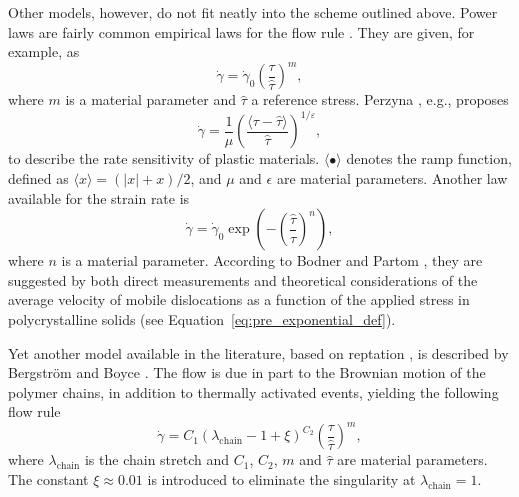 Other models, however, do not fit neatly into the scheme outlined above.
Power laws are fairly common empirical laws for the flow rule \citep{brownPowerlawCreepEquation1980}.
They are given, for example, as \citep{bergstromMechanicsSolidPolymers2015}
\begin{equation}
	\label{eq:flow_rule_power_law}
	\dot \gamma = \dot \gamma_0 \left(\frac{\tau}{\hat \tau}\right)^m,
\end{equation}
where $m$ is a material parameter and $\hat \tau$ a reference stress.
Perzyna \citep{perzynaConstitutiveEquationsRate1963}, e.g., proposes
\begin{equation}
\label{eq:flow_rule_perzyna}
  \dot \gamma = \frac{1}{\mu}\left(\frac{\langle\tau - \hat\tau\rangle}{\hat\tau}\right)^{1/\varepsilon},
\end{equation}
to describe the rate sensitivity of plastic materials.
$\langle\bullet\rangle$ denotes the ramp function, defined as $\langle x\rangle = (|x| + x) /2$, and $\mu$ and $\epsilon$ are material parameters.
Another law available for the strain rate is \citep{kellyInfluenceLimitingDislocation1974, bodnerLargeDeformationElasticViscoplastic1972}
\begin{equation}
  \label{eq:exp_flow_law}
	\dot \gamma = \dot \gamma_0 \exp\left(-\left(\frac{\hat \tau}{\tau}\right)^n\right),
\end{equation}
where $n$ is a material parameter.
According to Bodner and Partom \citep{bodnerLargeDeformationElasticViscoplastic1972}, they are suggested by both direct measurements and theoretical considerations of the average velocity of mobile dislocations as a function of the applied stress in polycrystalline solids (see Equation~\eqref{eq:pre_exponential_def}).

Yet another model available in the literature, based on reptation \citep{doiDynamicsConcentratedPolymer1978a}, is described by Bergström and Boyce \citep{bergstromConstitutiveModelingLarge1998, bergstromConstitutiveModelingTimedependent2001}.
The flow is due in part to the Brownian motion of the polymer chains, in addition to thermally activated events, yielding the following flow rule
\begin{equation}
	\label{eq:bb_reptation_model}
	\dot \gamma = C_1(\lambda_\text{chain} -1 + \xi)^{C_2}\left(\frac{\tau}{\hat\tau}\right)^{m},
\end{equation}
where $\lambda_\text{chain}$ is the chain stretch and $C_1$, $C_2$, $m$ and $\hat \tau$ are material parameters.
The constant $\xi\approx 0.01$ is introduced to eliminate the singularity at $\lambda_\text{chain}=1$.

